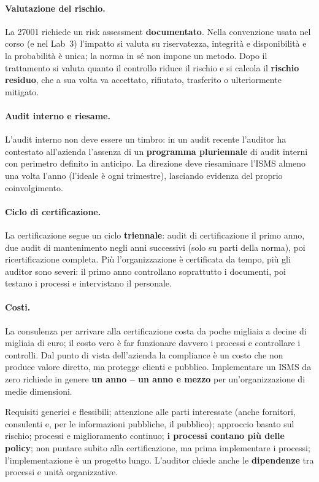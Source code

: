 \paragraph{Valutazione del rischio.} La 27001 richiede un risk assessment \textbf{documentato}. Nella
convenzione usata nel corso (e nel Lab~3) l'impatto si valuta su riservatezza, integrità e disponibilità
e la probabilità è unica; la norma in sé non impone un metodo. Dopo il trattamento si
valuta quanto il controllo riduce il rischio e si calcola il \textbf{rischio residuo}, che a sua volta va
accettato, rifiutato, trasferito o ulteriormente mitigato.

\paragraph{Audit interno e riesame.} L'audit interno non deve essere un timbro: in un audit recente
l'auditor ha contestato all'azienda l'assenza di un \textbf{programma pluriennale} di audit interni con
perimetro definito in anticipo. La direzione deve riesaminare l'ISMS almeno una volta l'anno (l'ideale è
ogni trimestre), lasciando evidenza del proprio coinvolgimento.

\paragraph{Ciclo di certificazione.} La certificazione segue un ciclo \textbf{triennale}: audit di
certificazione il primo anno, due audit di mantenimento negli anni successivi (solo su parti della
norma), poi ricertificazione completa. Più l'organizzazione è certificata da tempo, più gli auditor sono
severi: il primo anno controllano soprattutto i documenti, poi testano i processi e intervistano il
personale.

\paragraph{Costi.} La consulenza per arrivare alla certificazione costa da poche migliaia a decine di
migliaia di euro; il costo vero è far funzionare davvero i processi e controllare i controlli. Dal punto
di vista dell'azienda la compliance è un costo che non produce valore diretto, ma protegge clienti e
pubblico. Implementare un ISMS da zero richiede in genere \textbf{un anno -- un anno e mezzo} per
un'organizzazione di medie dimensioni.

\begin{nota}
Requisiti generici e flessibili; attenzione alle parti interessate (anche fornitori, consulenti e, per le
informazioni pubbliche, il pubblico); approccio basato sul rischio; processi e miglioramento continuo;
\textbf{i processi contano più delle policy}; non puntare subito alla certificazione, ma prima
implementare i processi; l'implementazione è un progetto lungo. L'auditor chiede anche le
\textbf{dipendenze} tra processi e unità organizzative.
\end{nota}

